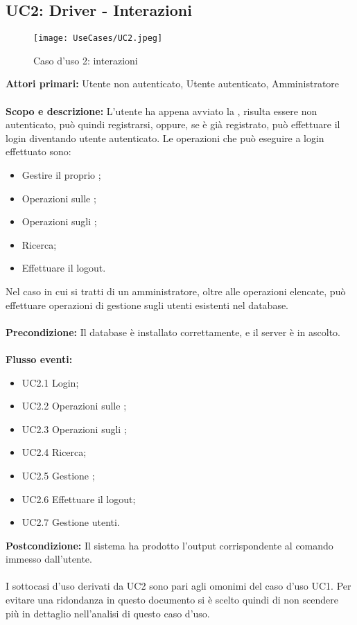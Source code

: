 \documentclass{scalatekids-article}
\begin{document}
\subsection{UC2: Driver - Interazioni}
\begin{figure}[H]
  \begin{center}
    \texttt{[image: UseCases/UC2.jpeg]}
    \caption{Caso d'uso 2:  interazioni}
  \end{center}
\end{figure}
\textbf{Attori primari:} Utente non autenticato, Utente autenticato, Amministratore\\ \\
\textbf{Scopo e descrizione:}
L’utente ha appena avviato la , risulta essere non autenticato, può quindi
registrarsi, oppure, se è già registrato, può effettuare il login diventando utente
autenticato. Le operazioni che può eseguire a login effettuato sono:
\begin{itemize}
\item Gestire il proprio ;
\item Operazioni sulle ;
\item Operazioni sugli ;
\item Ricerca;
\item Effettuare il logout.
\end{itemize}
Nel caso in cui si tratti di un amministratore, oltre alle operazioni elencate, può effettuare operazioni di gestione sugli utenti
esistenti nel database.\\ \\
\textbf{Precondizione:} Il database è installato correttamente, e il server è in ascolto.\\ \\
\textbf{Flusso eventi:}
\begin{itemize}
\item UC2.1 Login;
\item UC2.2 Operazioni sulle ;
\item UC2.3 Operazioni sugli ;
\item UC2.4 Ricerca;
\item UC2.5 Gestione ;
\item UC2.6 Effettuare il logout;
\item UC2.7 Gestione utenti.
\end{itemize}
\textbf{Postcondizione:} Il sistema ha prodotto l'output corrispondente al
comando immesso dall'utente.\\ \\ I sottocasi d'uso derivati da UC2 sono pari
agli omonimi del caso d'uso UC1. Per evitare una ridondanza in questo documento
si è scelto quindi di non scendere più in dettaglio nell'analisi di questo caso
d'uso.
\end{document}
